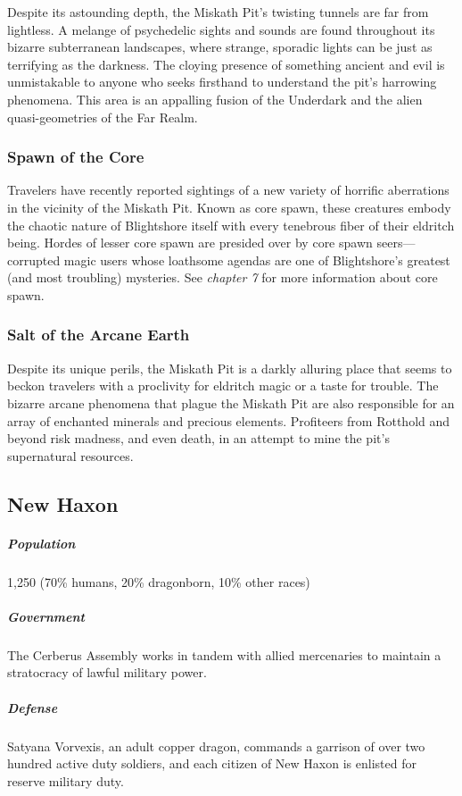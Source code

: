 \documentclass[10pt,a4paper,twoside,bg=print,twocolumn,openany,nodeprecatedcode]{dndbook}
\begin{document}
Despite its astounding depth, the Miskath Pit's twisting tunnels are far from lightless. A melange of psychedelic sights and sounds are found throughout its bizarre subterranean landscapes, where strange, sporadic lights can be just as terrifying as the darkness. The cloying presence of something ancient and evil is unmistakable to anyone who seeks firsthand to understand the pit's harrowing phenomena. This area is an appalling fusion of the Underdark and the alien quasi-geometries of the Far Realm.

\subsubsection{Spawn of the Core}
Travelers have recently reported sightings of a new variety of horrific aberrations in the vicinity of the Miskath Pit. Known as core spawn, these creatures embody the chaotic nature of Blightshore itself with every tenebrous fiber of their eldritch being. Hordes of lesser core spawn are presided over by core spawn seers—corrupted magic users whose loathsome agendas are one of Blightshore's greatest (and most troubling) mysteries. See \textit{chapter 7} for more information about core spawn.

\subsubsection{Salt of the Arcane Earth}
Despite its unique perils, the Miskath Pit is a darkly alluring place that seems to beckon travelers with a proclivity for eldritch magic or a taste for trouble. The bizarre arcane phenomena that plague the Miskath Pit are also responsible for an array of enchanted minerals and precious elements. Profiteers from Rotthold and beyond risk madness, and even death, in an attempt to mine the pit's supernatural resources.

\subsection{New Haxon}
\subparagraph{Population}
1,250 (70\% humans, 20\% dragonborn, 10\% other races)

\subparagraph{Government}
The Cerberus Assembly works in tandem with allied mercenaries to maintain a stratocracy of lawful military power.

\subparagraph{Defense}
Satyana Vorvexis, an adult copper dragon, commands a garrison of over two hundred active duty soldiers, and each citizen of New Haxon is enlisted for reserve military duty.
\end{document}
